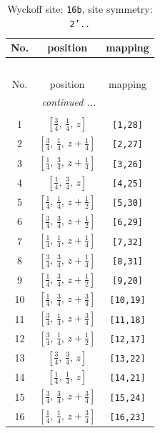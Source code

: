 \documentclass[fleqn,8pt]{jsarticle}
\begin{document}
\begin{longtable}{ccc}
\caption{Wyckoff site: {\tt 16b}, site symmetry: {\tt 2'..}}
 \\
 \hline \hline
No. & position & mapping \\ \hline \endfirsthead

\multicolumn{2}{l}{\tablename\ \thetable{}} \\
 \hline \hline
No. & position & mapping \\ \hline \endhead

 \hline \hline
\multicolumn{2}{r}{\footnotesize\it continued ...} \\ \endfoot

 \hline \hline
\multicolumn{2}{r}{} \\ \endlastfoot

1 & $\left[ \frac{3}{4},\, \frac{1}{4},\, z \right]$ & {\tt [1,28]} \\ \hline
2 & $\left[ \frac{3}{4},\, \frac{1}{4},\, z + \frac{1}{4} \right]$ & {\tt [2,27]} \\ \hline
3 & $\left[ \frac{1}{4},\, \frac{3}{4},\, z + \frac{1}{4} \right]$ & {\tt [3,26]} \\ \hline
4 & $\left[ \frac{1}{4},\, \frac{3}{4},\, z \right]$ & {\tt [4,25]} \\ \hline
5 & $\left[ \frac{1}{4},\, \frac{1}{4},\, z + \frac{1}{2} \right]$ & {\tt [5,30]} \\ \hline
6 & $\left[ \frac{3}{4},\, \frac{3}{4},\, z + \frac{1}{2} \right]$ & {\tt [6,29]} \\ \hline
7 & $\left[ \frac{1}{4},\, \frac{1}{4},\, z + \frac{1}{4} \right]$ & {\tt [7,32]} \\ \hline
8 & $\left[ \frac{3}{4},\, \frac{3}{4},\, z + \frac{1}{4} \right]$ & {\tt [8,31]} \\ \hline
9 & $\left[ \frac{1}{4},\, \frac{3}{4},\, z + \frac{1}{2} \right]$ & {\tt [9,20]} \\ \hline
10 & $\left[ \frac{1}{4},\, \frac{3}{4},\, z + \frac{3}{4} \right]$ & {\tt [10,19]} \\ \hline
11 & $\left[ \frac{3}{4},\, \frac{1}{4},\, z + \frac{3}{4} \right]$ & {\tt [11,18]} \\ \hline
12 & $\left[ \frac{3}{4},\, \frac{1}{4},\, z + \frac{1}{2} \right]$ & {\tt [12,17]} \\ \hline
13 & $\left[ \frac{3}{4},\, \frac{3}{4},\, z \right]$ & {\tt [13,22]} \\ \hline
14 & $\left[ \frac{1}{4},\, \frac{1}{4},\, z \right]$ & {\tt [14,21]} \\ \hline
15 & $\left[ \frac{3}{4},\, \frac{3}{4},\, z + \frac{3}{4} \right]$ & {\tt [15,24]} \\ \hline
16 & $\left[ \frac{1}{4},\, \frac{1}{4},\, z + \frac{3}{4} \right]$ & {\tt [16,23]} \\
\end{longtable}
\end{document}
